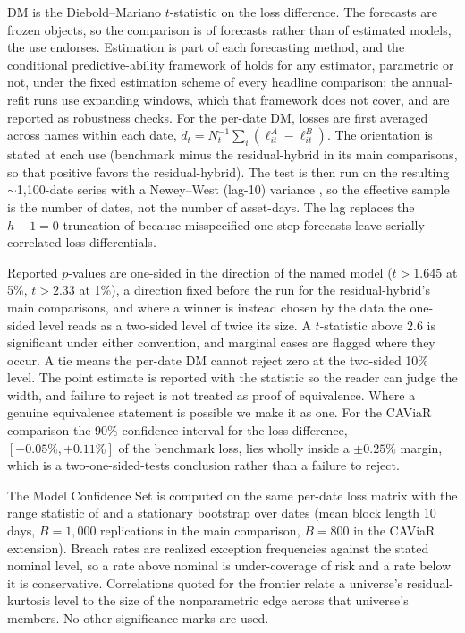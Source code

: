 \documentclass[11pt]{article}
\theoremstyle{remark}
\begin{document}
DM is the Diebold--Mariano $t$-statistic on the loss
difference. The forecasts are frozen objects, so the comparison is of forecasts rather than of estimated models, the use \citet{diebold2015} endorses. Estimation is part of each forecasting method, and the conditional predictive-ability framework of \citet{giacominiwhite2006} holds for any estimator, parametric or not, under the fixed estimation scheme of every headline comparison; the annual-refit runs use expanding windows, which that framework does not cover, and are reported as robustness checks. For the per-date DM, losses are first averaged across names within each date, $d_t = N_t^{-1}\sum_i (\ell^{A}_{it} - \ell^{B}_{it})$. The orientation is stated at each use (benchmark minus the residual-hybrid in its main comparisons, so that positive favors the residual-hybrid). The test is then run on the resulting $\sim$1{,}100-date series with a Newey--West (lag-10) variance \citep{neweywest1987}, so the effective sample is the number of dates, not the number of asset-days. The lag replaces the $h-1=0$ truncation of \citet{dieboldmariano1995} because misspecified one-step forecasts leave serially correlated loss differentials.

Reported $p$-values are one-sided in
the direction of the named model ($t>1.645$ at 5\%, $t>2.33$ at 1\%), a direction fixed before the run for the residual-hybrid's main comparisons, and where a winner is instead chosen by the data the one-sided level reads as a two-sided level of twice its size.
A $t$-statistic above $2.6$ is significant under either convention, and
marginal cases are flagged where they occur. A tie means the
per-date DM cannot reject zero at the two-sided 10\% level. The point
estimate is reported with the statistic so the reader can judge the
width, and failure to reject is not treated as proof of equivalence.
Where a genuine equivalence statement is possible we make it as one. For the CAViaR comparison the 90\% confidence interval for the loss difference, $[-0.05\%,+0.11\%]$ of the benchmark loss, lies wholly inside a $\pm0.25\%$ margin, which is a two-one-sided-tests conclusion rather than a failure to reject.

The Model Confidence Set is
computed on the same per-date loss matrix with the range statistic of \citet{hansen2011mcs} and a
stationary bootstrap over dates \citep{politisromano1994} (mean block length 10 days, $B=1{,}000$ replications
in the main comparison, $B=800$ in the CAViaR extension).
Breach
rates are realized exception frequencies against the stated nominal
level, so a rate above nominal is under-coverage of risk and a rate
below it is conservative. Correlations quoted for the frontier relate a universe's
residual-kurtosis level to the size of the nonparametric edge across
that universe's members. No other significance marks are used.
\end{document}
